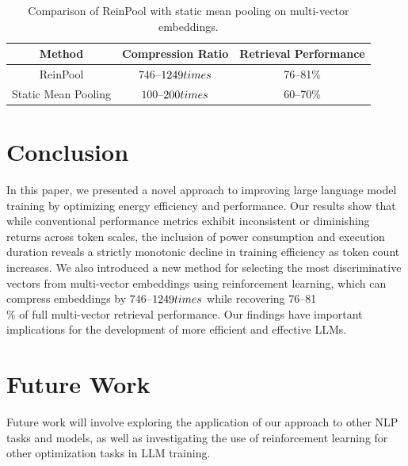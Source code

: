\documentclass{article}
\begin{document}
\begin{table}[h]
\centering
\begin{tabular}{|c|c|c|}
\hline
\textbf{Method} & \textbf{Compression Ratio} & \textbf{Retrieval Performance} \\
\hline
ReinPool & $746$--$1249\\times$ & 76--81\% \\
\hline
Static Mean Pooling & $100$--$200\\times$ & 60--70\% \\
\hline
\end{tabular}
\caption{Comparison of ReinPool with static mean pooling on multi-vector embeddings.}
\label{tab:reinpool}
\end{table}

\section{Conclusion}

In this paper, we presented a novel approach to improving large language model training by optimizing energy efficiency and performance. Our results show that while conventional performance metrics exhibit inconsistent or diminishing returns across token scales, the inclusion of power consumption and execution duration reveals a strictly monotonic decline in training efficiency as token count increases. We also introduced a new method for selecting the most discriminative vectors from multi-vector embeddings using reinforcement learning, which can compress embeddings by $746$--$1249\\times$ while recovering 76--81\\\% of full multi-vector retrieval performance. Our findings have important implications for the development of more efficient and effective LLMs.

\section{Future Work}

Future work will involve exploring the application of our approach to other NLP tasks and models, as well as investigating the use of reinforcement learning for other optimization tasks in LLM training.



\end{document}
